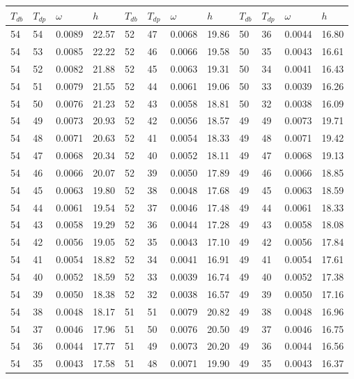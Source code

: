 \begin{tabular}{llll|llll|llll}
 \toprule 
\(T_{db}\) & \(T_{dp}\) & \(\omega\) & \(h\) & \(T_{db}\) & \(T_{dp}\) & \(\omega\) & \(h\) & \(T_{db}\) & \(T_{dp}\) & \(\omega\) & \(h\)  \\ \midrule 
54 & 54 & 0.0089 & 22.57 & 52 & 47 & 0.0068 & 19.86 & 50 & 36 & 0.0044 & 16.80\\
54 & 53 & 0.0085 & 22.22 & 52 & 46 & 0.0066 & 19.58 & 50 & 35 & 0.0043 & 16.61\\
54 & 52 & 0.0082 & 21.88 & 52 & 45 & 0.0063 & 19.31 & 50 & 34 & 0.0041 & 16.43\\
54 & 51 & 0.0079 & 21.55 & 52 & 44 & 0.0061 & 19.06 & 50 & 33 & 0.0039 & 16.26\\
54 & 50 & 0.0076 & 21.23 & 52 & 43 & 0.0058 & 18.81 & 50 & 32 & 0.0038 & 16.09\\
54 & 49 & 0.0073 & 20.93 & 52 & 42 & 0.0056 & 18.57 & 49 & 49 & 0.0073 & 19.71\\
54 & 48 & 0.0071 & 20.63 & 52 & 41 & 0.0054 & 18.33 & 49 & 48 & 0.0071 & 19.42\\
54 & 47 & 0.0068 & 20.34 & 52 & 40 & 0.0052 & 18.11 & 49 & 47 & 0.0068 & 19.13\\
54 & 46 & 0.0066 & 20.07 & 52 & 39 & 0.0050 & 17.89 & 49 & 46 & 0.0066 & 18.85\\
54 & 45 & 0.0063 & 19.80 & 52 & 38 & 0.0048 & 17.68 & 49 & 45 & 0.0063 & 18.59\\
54 & 44 & 0.0061 & 19.54 & 52 & 37 & 0.0046 & 17.48 & 49 & 44 & 0.0061 & 18.33\\
54 & 43 & 0.0058 & 19.29 & 52 & 36 & 0.0044 & 17.28 & 49 & 43 & 0.0058 & 18.08\\
54 & 42 & 0.0056 & 19.05 & 52 & 35 & 0.0043 & 17.10 & 49 & 42 & 0.0056 & 17.84\\
54 & 41 & 0.0054 & 18.82 & 52 & 34 & 0.0041 & 16.91 & 49 & 41 & 0.0054 & 17.61\\
54 & 40 & 0.0052 & 18.59 & 52 & 33 & 0.0039 & 16.74 & 49 & 40 & 0.0052 & 17.38\\
54 & 39 & 0.0050 & 18.38 & 52 & 32 & 0.0038 & 16.57 & 49 & 39 & 0.0050 & 17.16\\
54 & 38 & 0.0048 & 18.17 & 51 & 51 & 0.0079 & 20.82 & 49 & 38 & 0.0048 & 16.96\\
54 & 37 & 0.0046 & 17.96 & 51 & 50 & 0.0076 & 20.50 & 49 & 37 & 0.0046 & 16.75\\
54 & 36 & 0.0044 & 17.77 & 51 & 49 & 0.0073 & 20.20 & 49 & 36 & 0.0044 & 16.56\\
54 & 35 & 0.0043 & 17.58 & 51 & 48 & 0.0071 & 19.90 & 49 & 35 & 0.0043 & 16.37\\

\end{tabular}

